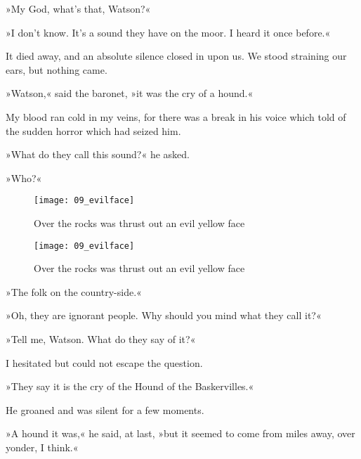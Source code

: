 »My God, what's that, Watson?«

»I don't know. It's a sound they have on the moor. I heard it once before.«

It died away, and an absolute silence closed in upon us. We stood straining our ears, but nothing came.

»Watson,« said the baronet, »it was the cry of a hound.«

My blood ran cold in my veins, for there was a break in his voice which told of the sudden horror which had seized him.

»What do they call this sound?« he asked.

»Who?«





\makeatletter
{}
{%
	\begin{figure}[hp]
	\centering
	\texttt{[image: 09\_evilface]}
	\caption{Over the rocks was thrust out an evil yellow face}
	\end{figure}
}{%
	\begin{figure}[h!]
	\centering
	\texttt{[image: 09\_evilface]}
	\caption{Over the rocks was thrust out an evil yellow face}
	\end{figure}
}

\makeatother

»The folk on the country-side.«

»Oh, they are ignorant people. Why should you mind what they call it?«

 
»Tell me, Watson. What do they say of it?«

I hesitated but could not escape the question.

»They say it is the cry of the Hound of the Baskervilles.«

He groaned and was silent for a few moments.

»A hound it was,« he said, at last, »but it seemed to come from miles away, over yonder, I think.«

